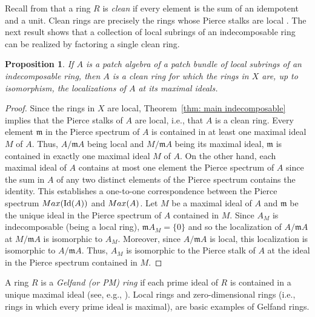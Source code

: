 \documentclass[11pt]{amsart}
\def\m{{\mathfrak m}} %
\newtheorem{proposition}[theorem]{Proposition}
\theoremstyle{definition}
\def\Id{\mbox{\rm Id}}
\begin{document}
Recall from \cite{Nic77} that a ring $R$ is {\it clean} if every element is the sum of an idempotent and a unit. Clean rings are precisely the rings whose Pierce stalks are local \cite[Theorem 3.4]{BurSte79}. The next result shows that a collection of local subrings of an indecomposable ring can be realized by factoring a single clean ring.

\begin{proposition}\label{proposition: A clean}
 If $A$ is a patch algebra of a patch bundle of local subrings of an indecomposable ring, then $A$ is a clean ring for which the rings in $X$ are, up to isomorphism, the localizations of $A$ at its maximal ideals. 
\end{proposition} 

\begin{proof}
 Since the rings in $X$ are local, Theorem~\ref{thm: main indecomposable} implies that the Pierce stalks of $A$ are local, i.e., that $A$ is a clean ring. Every element $\m$ in the Pierce spectrum of $A$ is contained in at least one maximal ideal $M$ of $A$. Thus, $A/\m A$ being local and $M/\m A$ being its maximal ideal, $\m$ is contained in exactly one maximal ideal $M$ of $A$. On the other hand, each maximal ideal of $A$ contains at most one element the Pierce spectrum of $A$ since the sum in $A$ of any two distinct elements of the Pierce spectrum contains the identity. This establishes a one-to-one correspondence between the Pierce spectrum ${\rm Max}(\Id(A))$ and ${\rm Max}(A)$. Let $M$ be a maximal ideal of $A$ and $\m$ be the unique ideal in the Pierce spectrum of $A$ contained in $M$. Since $A_M$ is indecomposable (being a local ring), $\m A_M=\{0\}$ and so the localization of $A/\m A$ at $M/\m A$ is isomorphic to $A_M$. Moreover, since  $A/\m A$ is local, this localization is isomorphic to $A/\m A$. Thus, $A_M$ is isomorphic to the Pierce stalk of $A$ at the ideal in the Pierce spectrum contained in $M$. 
\end{proof}

A ring $R$ is a {\it Gelfand (or PM) ring} if each prime ideal of $R$ is contained in a unique maximal ideal (see, e.g., \cite{Contessa}). Local rings and zero-dimensional rings (i.e., rings in which every prime ideal is maximal), are basic examples of Gelfand rings. 
\end{document}
